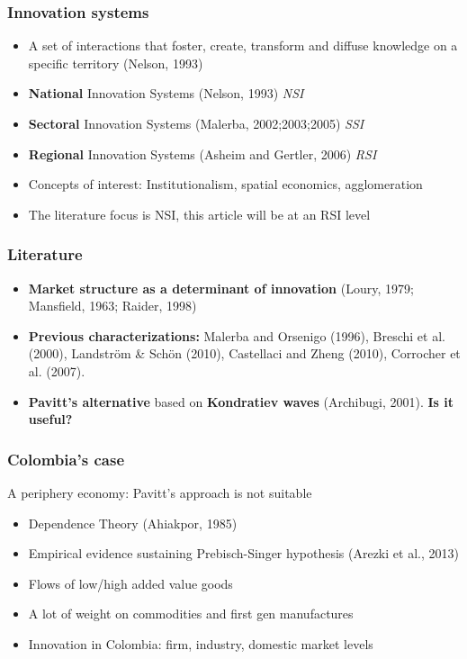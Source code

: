 \documentclass{beamer}
\begin{document}
	\begin{frame}[allowframebreaks]
		\frametitle{Innovation systems}
		\begin{itemize}
			\item A set of interactions that foster, create, transform and diffuse
			knowledge on a specific territory (Nelson, 1993)
			\item \textbf{National} Innovation Systems (Nelson, 1993) \textit{NSI}
			\item \textbf{Sectoral} Innovation Systems (Malerba, 2002;2003;2005) \textit{SSI}
			\item \textbf{Regional} Innovation Systems (Asheim and Gertler, 2006) \textit{RSI}
			\item Concepts of interest: Institutionalism, spatial economics, agglomeration
			\item The literature focus is NSI, this article will be at an RSI level
		\end{itemize}
	\end{frame}
	\begin{frame}
		\frametitle{Literature}
		\begin{itemize}
			\item \textbf{Market structure as a determinant of innovation} (Loury, 1979; Mansfield, 1963; Raider, 1998)
			\item \textbf{Previous characterizations:} Malerba and Orsenigo (1996), Breschi et al. (2000), Landström \& Schön (2010), Castellaci and Zheng (2010), Corrocher et al. (2007).
			\item \textbf{Pavitt's alternative} based on \textbf{Kondratiev waves} (Archibugi, 2001). \textbf{Is it useful?}
			
		\end{itemize}
	\end{frame}
	\begin{frame}
		\frametitle{Colombia's case}
	A periphery economy: Pavitt's approach is not suitable
	\begin{itemize}
		\item Dependence Theory (Ahiakpor, 1985)
		\item Empirical evidence sustaining Prebisch-Singer hypothesis (Arezki et al., 2013)
		\item Flows of low/high added value goods
		\item A lot of weight on commodities and first gen manufactures
		\item Innovation in Colombia: firm, industry, domestic market levels
	\end{itemize}
	\end{frame}
\end{document}
